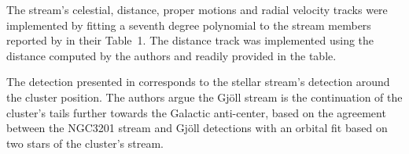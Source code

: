 The stream's celestial, distance, proper motions and radial velocity tracks were implemented by fitting a seventh degree polynomial to the stream members reported by \citet{Ibata2021} in their Table~1. The distance track was implemented using the distance computed by the authors and readily provided in the table.

The detection presented in \citet{Ibata2021} corresponds to the stellar stream's detection around the cluster position. The authors argue the Gj\"oll stream is the continuation of the cluster's tails further towards the Galactic anti-center, based on the agreement between the NGC3201 stream and Gj\"oll detections with an orbital fit based on two stars of the cluster's stream. 
